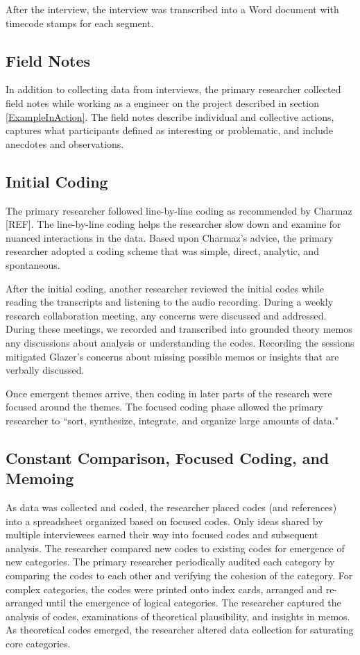 After the interview, the interview was transcribed into a Word document with timecode stamps for each segment.

\subsection{Field Notes}
In addition to collecting data from interviews, the primary researcher collected field notes while working as a engineer on the project described in section \ref{ExampleInAction}. The field notes describe individual and collective actions, captures what participants defined as interesting or problematic, and include anecdotes and observations. 
\subsection{Initial Coding}
The primary researcher followed line-by-line coding as recommended by Charmaz [REF]. The line-by-line coding helps the researcher slow down and examine for nuanced interactions in the data. Based upon Charmaz's advice, the primary researcher adopted a coding scheme that was simple, direct, analytic, and spontaneous.  

After the initial coding, another researcher reviewed the initial codes while reading the transcripts and listening to the audio recording. During a weekly research collaboration meeting, any concerns were discussed and addressed. During these meetings, we recorded and transcribed into grounded theory memos any discussions about analysis or understanding the codes. Recording the sessions mitigated Glazer's concerns about missing possible memos or insights that are verbally discussed. \cite{GlaserTheoreticalSensitivity}

Once emergent themes arrive, then coding in later parts of the research were focused around the themes. The focused coding phase allowed the primary researcher to ``sort, synthesize, integrate, and organize large amounts of data."
\subsection{Constant Comparison, Focused Coding, and Memoing}
As data was collected and coded, the researcher placed codes (and references) into a spreadsheet organized based on focused codes. Only ideas shared by multiple interviewees earned their way into focused codes and subsequent analysis. The researcher compared new codes to existing codes for emergence of new categories. The primary researcher periodically audited each category by comparing the codes to each other and verifying the cohesion of the category. For complex categories, the codes were printed onto index cards, arranged and re-arranged until the emergence of logical categories.  The researcher captured the analysis of codes, examinations of theoretical plausibility, and insights in memos. As theoretical codes emerged, the researcher altered data collection for saturating core categories. 

